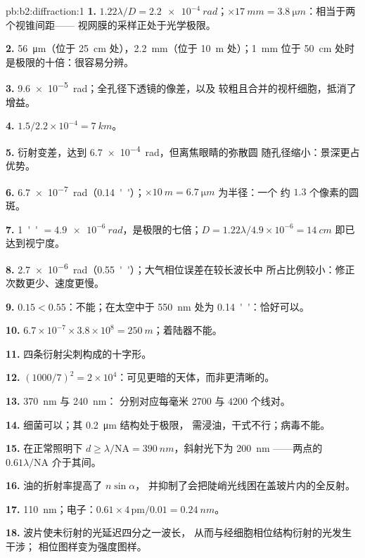 \begin{solution}{pb:b2:diffraction:1}
\textbf{1.} $1.22\lambda/D = \qty{2.2e-4}{rad}$；$\times\qty{17}{mm} = \qty{3.8}{\micro m}$：相当于两个视锥间距——
视网膜的采样正处于光学极限。

\textbf{2.} \qty{56}{\micro m}（位于 \qty{25}{cm} 处），\qty{2.2}{mm}（位于 \qty{10}{m} 处）；\qty{1}{mm} 位于
\qty{50}{cm} 处时是极限的十倍：很容易分辨。

\textbf{3.} \qty{9.6e-5}{rad}；全孔径下透镜的像差，以及
较粗且合并的视杆细胞，抵消了增益。

\textbf{4.} $1.5/2.2 \times 10^{-4} = \qty{7}{km}$。

\textbf{5.} 衍射变差，达到 \qty{6.7e-4}{rad}，但离焦眼睛的弥散圆
随孔径缩小：景深更占优势。

\textbf{6.} \qty{6.7e-7}{rad}（\qty{0.14}{''}）；$\times\qty{10}{m} = \qty{6.7}{\micro m}$ 为半径：一个
约 $1.3$ 个像素的圆斑。

\textbf{7.} \qty{1}{''} $= \qty{4.9e-6}{rad}$，是极限的七倍；$D = 1.22\lambda/4.9
\times 10^{-6} = \qty{14}{cm}$ 即已达到视宁度。

\textbf{8.} \qty{2.7e-6}{rad}（\qty{0.55}{''}）；大气相位误差在较长波长中
所占比例较小：修正次数更少、速度更慢。

\textbf{9.} $0.15 < 0.55$：不能；在太空中于 \qty{550}{nm} 处为 \qty{0.14}{''}：恰好可以。

\textbf{10.} $6.7 \times 10^{-7} \times 3.8 \times 10^8 = \qty{250}{m}$；着陆器不能。

\textbf{11.} 四条衍射尖刺构成的十字形。

\textbf{12.} $(1000/7)^2 = 2 \times 10^4$：可见更暗的天体，而非更清晰的。

\textbf{13.} \qty{370}{nm} 与 \qty{240}{nm}：
分别对应每毫米 $2700$ 与 $4200$ 个线对。

\textbf{14.} 细菌可以；其 \qty{0.2}{\micro m} 结构处于极限，
需浸油，干式不行；病毒不能。

\textbf{15.} 在正常照明下 $d \ge \lambda/\mathrm{NA} = \qty{390}{nm}$，斜射光下为 \qty{200}{nm}
——两点的 $0.61\lambda/\mathrm{NA}$ 介于其间。

\textbf{16.} 油的折射率提高了 $n\sin\alpha$，
并抑制了会把陡峭光线困在盖玻片内的全反射。

\textbf{17.} \qty{110}{nm}；电子：$0.61 \times 4\,\text{pm}/0.01 = \qty{0.24}{nm}$。

\textbf{18.} 波片使未衍射的光延迟四分之一波长，
从而与经细胞相位结构衍射的光发生干涉；
相位图样变为强度图样。


\end{solution}
